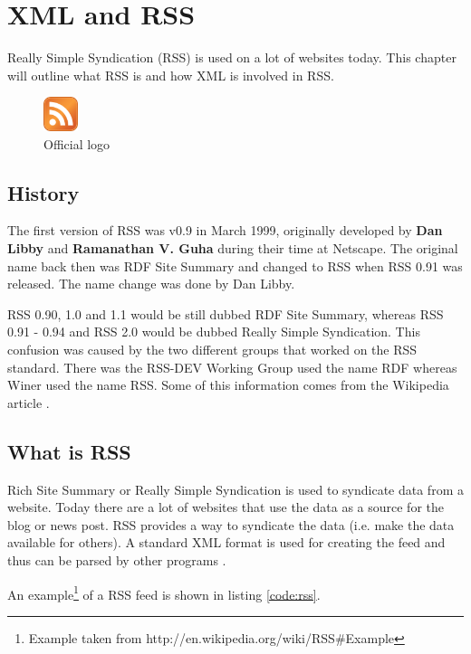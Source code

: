 \chapter{XML and RSS}
\label{chap:XML and RSS}
Really Simple Syndication (RSS) is used on a lot of websites today. This chapter will outline what RSS is and how XML is involved in RSS.

\begin{figure}[ht]
\begin{center}
\includegraphics[width=1cm]{Chapters/01_rss_icon.png}
\caption{Official logo\footnotemark}
\end{center}
\end{figure}


\section{History}
The first version of RSS was v0.9 in March 1999, originally developed by \textbf{Dan Libby} and \textbf{Ramanathan V. Guha} during their time at Netscape. The original name back then was RDF Site Summary and changed to RSS when RSS 0.91 was released. The name change was done by Dan Libby.

RSS 0.90, 1.0 and 1.1 would be still dubbed RDF Site Summary, whereas RSS 0.91 - 0.94 and RSS 2.0 would be dubbed Really Simple Syndication. This confusion was caused by the two different groups that worked on the RSS standard. There was the RSS-DEV Working Group used the name RDF whereas Winer used the name RSS. Some of this information comes from the Wikipedia article \cite{rss-wiki}.

\section{What is RSS}
\label{sec:what-is-rss}
Rich Site Summary or Really Simple Syndication is used to syndicate data from a website. Today there are a lot of websites that use the data as a source for the blog or news post. RSS provides a way to syndicate the data (i.e. make the data available for others). A standard XML format is used for creating the feed and thus can be parsed by other programs \cite{web-content-syndication}.

An example\footnote{Example taken from http://en.wikipedia.org/wiki/RSS\#Example} of a RSS feed is shown in listing \ref{code:rss}.

